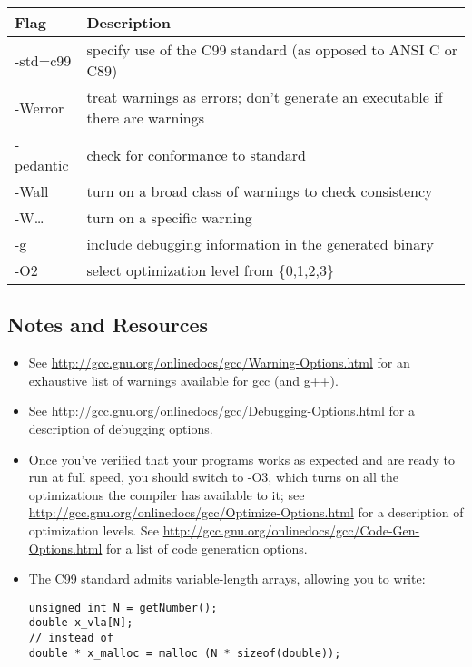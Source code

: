 \documentclass[letterpaper,12pt]{article}
\begin{document}
\begin{center}
\begin{tabular}{l l}
Flag & Description \\ \hline
-std=c99 & specify use of the C99 standard (as opposed to ANSI C or C89) \\
-Werror & treat warnings as errors; don't generate an executable if there are warnings\\
-pedantic & check for conformance to standard\\
-Wall & turn on a broad class of warnings to check consistency\\
-W\ldots & turn on a specific warning\\
-g & include debugging information in the generated binary\\
-O2 & select optimization level from \{0,1,2,3\}\\
\end{tabular}
\end{center}

\subsection*{Notes and Resources}
\begin{itemize}
\item See \url{http://gcc.gnu.org/onlinedocs/gcc/Warning-Options.html} for an exhaustive list of warnings available for gcc (and g++).
\item See \url{http://gcc.gnu.org/onlinedocs/gcc/Debugging-Options.html} for a description of debugging options.
\item Once you've verified that your programs works as expected and are ready to run at full speed, you should switch to -O3, which turns on all the optimizations the compiler has available to it; see \url{http://gcc.gnu.org/onlinedocs/gcc/Optimize-Options.html} for a description of optimization levels. See \url{http://gcc.gnu.org/onlinedocs/gcc/Code-Gen-Options.html} for a list of code generation options. 
\item The C99 standard admits variable-length arrays, allowing you to write:

\begin{verbatim}
unsigned int N = getNumber();
double x_vla[N];
// instead of 
double * x_malloc = malloc (N * sizeof(double));
\end{verbatim}

\end{itemize}
\end{document}

